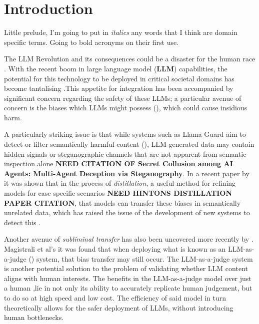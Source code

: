 
\usepackage{morefloats}
                                          




\tableofcontents

\section{Introduction}

Little prelude, I'm going to put in \textit{italics} any words that I think are domain specific terms. Going to bold acronyms on their first use.

The LLM Revolution and its consequences could be a disaster for the human race \citep{kaczynski1995industrial}. With the recent boom in large language model (\textbf{LLM}) capabilities, the potential for this technology to be deployed in critical societal domains has become tantalising \citep{woo2025clinicaldocumentation}.This appetite for integration has been accompanied by significant concern regarding the safety of these LLMs; a particular avenue of concern is the biases which LLMs might possess (\citep{fareed2025systematic}), which could cause insidious harm. 

A particularly striking issue is that while systems such as Llama Guard aim to detect or filter semantically harmful content (\citep{inan2023llamaguardllmbasedinputoutput}), LLM-generated data may contain hidden signals or steganographic channels that are not apparent from semantic inspection alone \textbf{NEED CITATION OF Secret Collusion among AI Agents:
Multi-Agent Deception via Steganography}. In a recent paper by \citep{cloud2025subliminal} it was shown that in the process of \textit{distillation}, a useful method for refining models for case specific scenarios \textbf{NEED HINTONS DISTILLATION PAPER CITATION}, that models can transfer these biases in semantically unrelated data, which has raised the issue of the development of new systems to detect this . 

Another avenue of \textit{subliminal transfer} has also been uncovered more recently by \citep{magistrali2026subliminal}. Magistrali et al's it was found that when deploying what is known as an LLM-as-a-judge (\citep{zheng2023judging}) system, that bias transfer may still occur. The LLM-as-a-judge system is another potential solution to the problem of validating whether LLM content aligns with human interests. The benefits in the LLM-as-a-judge model over just a human ,lie in not only its ability to accurately replicate human judgement, but to do so at high speed and low cost. The efficiency of said model in turn theoretically allows for the safer deployment of LLMs, without introducing human bottlenecks. 

